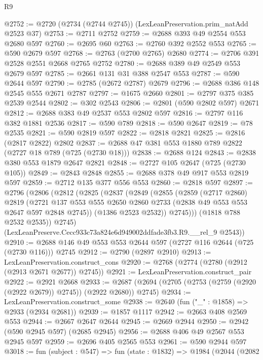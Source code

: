 \begin{lexlean}{R9}
\begin{coremodule}
@2752 := @2720 (@2734 (@2744 @2745)) (LexLeanPreservation.prim_natAdd @2523 @37)
@2753 := @2711 @2752
@2759 := @2688 @393 @49 @2554 @553 @2680 @597
@2760 := @2695 @60
@2763 := @2760 @392 @2552 @553
@2765 := @590 @2679 @597
@2768 := @2763 (@2700 @2765) @2680
@2774 := @2706 @391 @2528 @2551 @2668 @2765 @2752
@2780 := @2688 @389 @49 @2549 @553 @2679 @597
@2785 := @2661 @131 @31 @388 @2547 @553
@2787 := @590 @2644 @597
@2790 := @2785 (@2672 @2787) @2679
@2796 := @2688 @386 @148 @2545 @555 @2671 @2787
@2797 := @1675 @2660
@2801 := @2797 @375 @385 @2539 @2544
@2802 := @302 @2543
@2806 := @2801 (@590 @2802 @597) @2671
@2812 := @2688 @383 @49 @2537 @553 @2802 @597
@2816 := @2797 @116 @382 @1881 @2536
@2817 := @590 @789
@2818 := @590 @2647
@2819 := @78 @2535
@2821 := @590 @2819 @597
@2822 := @2818 @2821
@2825 := @2816 (@2817 @2822) @2802
@2837 := @2688 @47 @381 @553 @1880 @789 @2822 (@2727 @18 @789 (@725 (@2730 @18)))
@2838 := @2688 @124
@2843 := @2838 @380 @553 @1879 @2647 @2821
@2848 := @2727 @105 @2647 (@725 (@2730 @105))
@2849 := @2843 @2848
@2855 := @2688 @378 @49 @917 @553 @2819 @597
@2859 := @2712 @135 @377 @556 @553
@2860 := @2818 @597
@2897 := @2796
    (@2806
      (@2812
        (@2825
          (@2837
            (@2849
              (@2855
                (@2859
                  (@2717 @2860)
                  @2819
                  (@2721
                    @137
                    @553
                    @555
                    @2650
                    @2860
                    @2733
                    (@2838 @49 @553 @553 @2647 @597 @2848 @2745))
                  (@1386 @2523 @2532))
                @2745)))
          (@1818 @788 @2532 @2535))
        @2745)
      (LexLeanPreserve.Cecc933c73a824e6d949002ddfade3fb3.R9.__rel_9 @2543))
@2910 := @2688 @146 @49 @553 @553 @2644 @597 (@2727 @116 @2644 (@725 (@2730 @116))) @2745
@2912 := @2790 (@2897 @2910)
@2913 := LexLeanPreservation.construct_cons
@2920 := @2768 (@2774 (@2780 (@2912 (@2913 @2671 @2677)) @2745))
@2921 := LexLeanPreservation.construct_pair
@2922 := @2921 @2668
@2933 := @2687 (@2694 (@2705 (@2753 (@2759 (@2920 (@2922 @2679)) @2745)) (@2922 @2680)) @2745)
@2934 := LexLeanPreservation.construct_some
@2938 := @2640 (fun ("_" : @1858) => @2933 (@2934 @2681))
@2939 := @1857 @1117
@2942 := @2663 @408 @2569 @553
@2944 := @2667 @2647 @2644
@2945 := @2669 @2944
@2950 := @2942 (@590 @2945 @597) (@2685 @2945)
@2956 := @2688 @406 @49 @2567 @553 @2945 @597
@2959 := @2696 @405 @2565 @553
@2961 := @590 @2944 @597
@3018 := fun (subject : @547) =>
  fun (state : @1832) =>
  @1984
    (@2044
      (@2082

\end{coremodule}
\end{lexlean}
